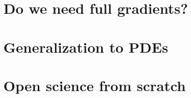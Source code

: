 \documentclass[12pt]{article}
\begin{document}
\section{Do we need full gradients?}

\section{Generalization to PDEs}

\section{Open science from scratch}


\printbibliography
\end{document}
